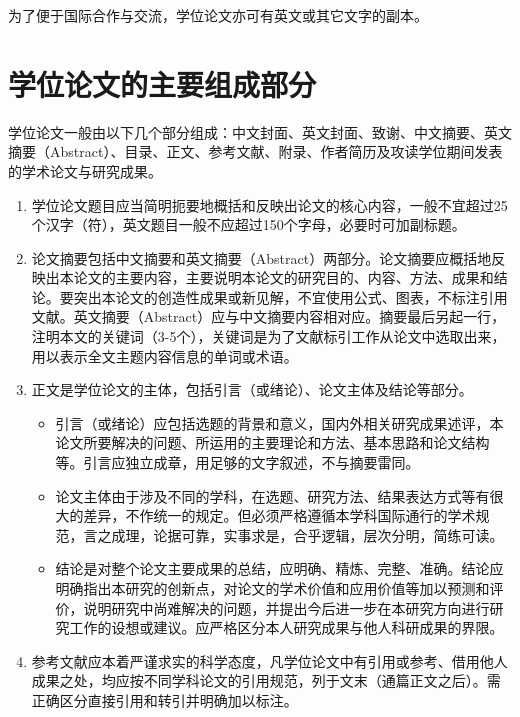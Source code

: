 为了便于国际合作与交流，学位论文亦可有英文或其它文字的副本。

\section{学位论文的主要组成部分}

学位论文一般由以下几个部分组成：中文封面、英文封面、致谢、中文摘要、英文摘要（Abstract）、目录、正文、参考文献、附录、作者简历及攻读学位期间发表的学术论文与研究成果。

\begin{enumerate}
  \item 学位论文题目应当简明扼要地概括和反映出论文的核心内容，一般不宜超过25个汉字（符），英文题目一般不应超过150个字母，必要时可加副标题。

  \item 论文摘要包括中文摘要和英文摘要（Abstract）两部分。论文摘要应概括地反映出本论文的主要内容，主要说明本论文的研究目的、内容、方法、成果和结论。要突出本论文的创造性成果或新见解，不宜使用公式、图表，不标注引用文献。英文摘要（Abstract）应与中文摘要内容相对应。摘要最后另起一行，注明本文的关键词（3-5个），关键词是为了文献标引工作从论文中选取出来，用以表示全文主题内容信息的单词或术语。

  \item 正文是学位论文的主体，包括引言（或绪论）、论文主体及结论等部分。
    \begin{itemize}
      \item 引言（或绪论）应包括选题的背景和意义，国内外相关研究成果述评，本论文所要解决的问题、所运用的主要理论和方法、基本思路和论文结构等。引言应独立成章，用足够的文字叙述，不与摘要雷同。

      \item 论文主体由于涉及不同的学科，在选题、研究方法、结果表达方式等有很大的差异，不作统一的规定。但必须严格遵循本学科国际通行的学术规范，言之成理，论据可靠，实事求是，合乎逻辑，层次分明，简练可读。

      \item 结论是对整个论文主要成果的总结，应明确、精炼、完整、准确。结论应明确指出本研究的创新点，对论文的学术价值和应用价值等加以预测和评价，说明研究中尚难解决的问题，并提出今后进一步在本研究方向进行研究工作的设想或建议。应严格区分本人研究成果与他人科研成果的界限。
    \end{itemize}

  \item 参考文献应本着严谨求实的科学态度，凡学位论文中有引用或参考、借用他人成果之处，均应按不同学科论文的引用规范，列于文末（通篇正文之后）。需正确区分直接引用和转引并明确加以标注。


\end{enumerate}
